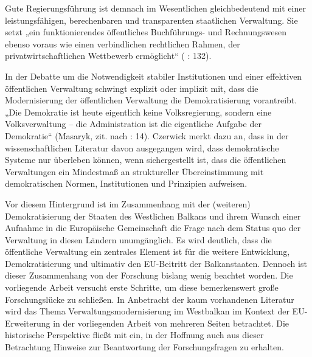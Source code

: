 Gute Regierungsführung ist demnach im Wesentlichen gleichbedeutend mit einer leistungsfähigen, berechenbaren und transparenten staatlichen Verwaltung. Sie setzt „ein funktionierendes öffentliches Buchführungs- und Rechnungswesen ebenso voraus wie einen verbindlichen rechtlichen Rahmen, der privatwirtschaftlichen Wettbewerb ermöglicht“ (\cite{schmitz09} : 132).
\par
In der Debatte um die Notwendigkeit stabiler Institutionen und einer effektiven öffentlichen Verwaltung schwingt explizit oder implizit mit, dass die Modernisierung der öffentlichen Verwaltung die Demokratisierung vorantreibt. „Die Demokratie ist heute eigentlich keine Volksregierung, sondern eine Volksverwaltung – die Administration ist die eigentliche Aufgabe der Demokratie“ (Masaryk, zit. nach \cite{czerwick} : 14). Czerwick merkt dazu an, dass in der wissenschaftlichen Literatur davon ausgegangen wird, dass demokratische Systeme nur überleben können, wenn sichergestellt ist, dass die öffentlichen Verwaltungen ein Mindestmaß an struktureller Übereinstimmung mit demokratischen Normen, Institutionen und Prinzipien aufweisen.
\par
Vor diesem Hintergrund ist im Zusammenhang mit der (weiteren) Demokratisierung der Staaten des Westlichen Balkans und ihrem Wunsch einer Aufnahme in die Europäische Gemeinschaft die Frage nach dem Status quo der Verwaltung in diesen Ländern unumgänglich. Es wird deutlich, dass die öffentliche Verwaltung ein zentrales Element ist für die weitere Entwicklung, Demokratisierung und ultimativ den EU-Beitritt der Balkanstaaten. Dennoch ist dieser Zusammenhang von der Forschung bislang wenig beachtet worden. Die vorliegende Arbeit versucht erste Schritte, um diese bemerkenswert große Forschungslücke zu schließen. In Anbetracht der kaum vorhandenen Literatur wird das Thema Verwaltungsmodernisierung im Westbalkan im Kontext der EU-Erweiterung in der vorliegenden Arbeit von mehreren Seiten betrachtet. Die historische Perspektive fließt mit ein, in der Hoffnung auch aus dieser Betrachtung Hinweise zur Beantwortung der Forschungsfragen zu erhalten.
